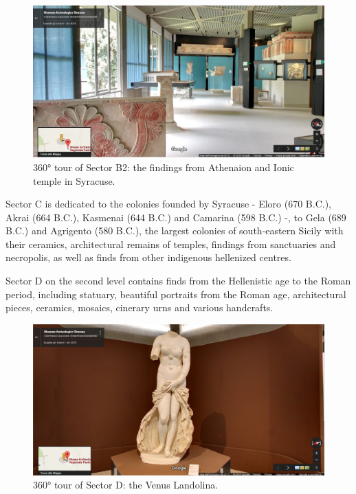 \documentclass[amsthm,ebook]{saparticle}
\begin{document}
\begin{figure}[!bp]
\centering
 \includegraphics[width=\columnwidth]{EAGLE2016BONACINIPilotprojectatPaoloOrsiMuseum-img003.jpg}
\caption{360° tour of Sector B2: the findings from Athenaion and Ionic temple in Syracuse.}
\label{fig:3}
\end{figure}

Sector C is dedicated to the colonies founded by Syracuse - Eloro (670 B.C.), Akrai (664 B.C.), Kasmenai (644 B.C.) and
Camarina (598 B.C.) -, to Gela (689 B.C.) and Agrigento (580 B.C.), the largest colonies of south-eastern Sicily with
their ceramics, architectural remains of temples, findings from sanctuaries and necropolis, as well as finds from other
indigenous hellenized centres. 

Sector D on the second level contains finds from the Hellenistic age to the Roman period, including statuary, beautiful
portraits from the Roman age, architectural pieces, ceramics, mosaics, cinerary urns and various handcrafts. 

\begin{figure}[!bp]
\centering
 \includegraphics[width=\columnwidth]{EAGLE2016BONACINIPilotprojectatPaoloOrsiMuseum-img004.jpg}
\caption{360° tour of Sector D: the Venus Landolina.}
\label{fig:4}
\end{figure}
\end{document}

